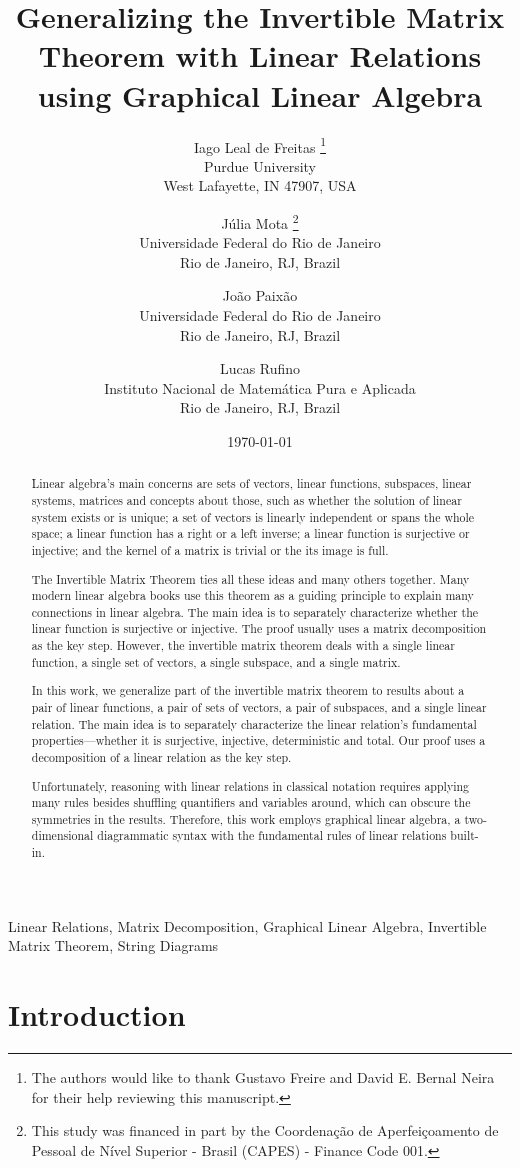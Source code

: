 \documentclass[manyauthors]{fundam}
\title{Generalizing the Invertible Matrix Theorem with Linear Relations using Graphical Linear Algebra}
\date{\today}
\author{%
Iago Leal de Freitas%
\thanks{The authors would like to thank Gustavo Freire and David E. Bernal Neira for their help reviewing this manuscript.}%
\\ Purdue University \\ West Lafayette, IN 47907, USA \\
\and
Júlia Mota\thanksas{1}%
\thanks{This study was financed in part by the Coordenação de Aperfeiçoamento de Pessoal de Nível Superior - Brasil (CAPES) - Finance Code 001.}%
\\ Universidade Federal do Rio de Janeiro \\ Rio de Janeiro, RJ, Brazil
\and
João Paixão\thanksas{1}%
\\ Universidade Federal do Rio de Janeiro \\ Rio de Janeiro, RJ, Brazil
\and
Lucas Rufino\thanksas{1}\thanksas{2}\corresponding%
\\ Instituto Nacional de Matemática Pura e Aplicada \\ Rio de Janeiro, RJ, Brazil
}
\begin{document}
\maketitle

\begin{abstract}
Linear algebra's main concerns are sets of vectors, linear functions, subspaces, linear systems, matrices and concepts about those, such as whether the solution of linear system exists or is unique; a set of vectors is linearly independent or spans the whole space; a linear function has a right or a left inverse; a linear function is surjective or injective; and the kernel of a matrix is trivial or the its image is full.

The Invertible Matrix Theorem ties all these ideas and many others together.
Many modern linear algebra books use this theorem as a guiding principle to explain many connections in linear algebra. The main idea is to separately characterize whether the linear function is surjective or injective. The proof usually uses a matrix decomposition as the key step.
However, the invertible matrix theorem deals with a single linear function, a single set of vectors, a single subspace, and a single matrix.

In this work, we generalize part of the invertible matrix theorem to results about
a pair of linear functions, a pair of sets of vectors, a pair of subspaces, and a single linear relation.
The main idea is to separately characterize the linear relation's fundamental properties---whether it is surjective, injective, deterministic and total.
Our proof uses a decomposition of a linear relation as the key step.

Unfortunately, reasoning with linear relations in classical notation requires
applying many rules besides shuffling quantifiers and variables around,
which can obscure the symmetries in the results.
Therefore,  this work employs graphical linear algebra,
a two-dimensional diagrammatic syntax with the fundamental rules of linear relations built-in.
\end{abstract}

\begin{keywords}
Linear Relations, Matrix Decomposition, Graphical Linear Algebra, Invertible Matrix Theorem, String Diagrams
\end{keywords}

\tableofcontents
\newpage

\section{Introduction}
\label{sec:introduction}
\end{document}
